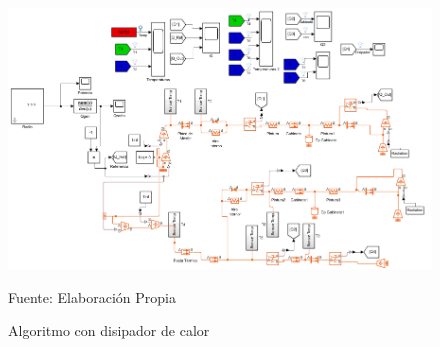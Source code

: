 \begin{figure}[H]
\centering
\includegraphics[scale=0.6]{Figuras/algoritmo_final.png}
\caption{Algoritmo con disipador de calor}
Fuente: Elaboración Propia
\label{anexo11}
\end{figure}